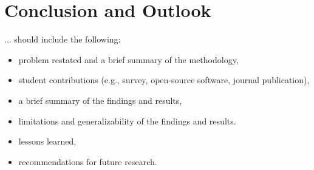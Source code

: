 \chapter{Conclusion and Outlook\label{cha:conclusion}}
... should include the following:
\begin{itemize}

\item problem restated and a brief summary of the methodology,
\item student contributions (e.g., survey, open-source software, journal publication),
\item a brief summary of the findings and results,
\item limitations and generalizability of the findings and results.
\item lessons learned,
\item recommendations for future research.

\end{itemize}

